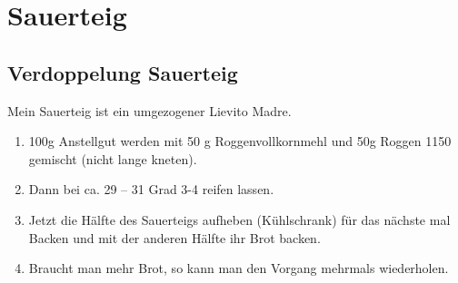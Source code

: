%
%
%


\chapter{Sauerteig}

\section{Verdoppelung \Gls{Sauerteig}}\label{sec:Sauerteig}
Mein Sauerteig ist ein umgezogener Lievito Madre.  

\begin{enumerate}
    \item 100\;g Anstellgut werden mit 50\; g Roggenvollkornmehl und 50\;g Roggen 1150 gemischt (nicht lange kneten). 
    \item Dann bei ca. 29 -- 31 Grad 3-4 reifen lassen.
    \item Jetzt die Hälfte des Sauerteigs aufheben (Kühlschrank) für das nächste mal Backen und mit der anderen Hälfte ihr Brot backen.
    \item Braucht man mehr Brot, so kann man den Vorgang mehrmals wiederholen.
\end{enumerate}


